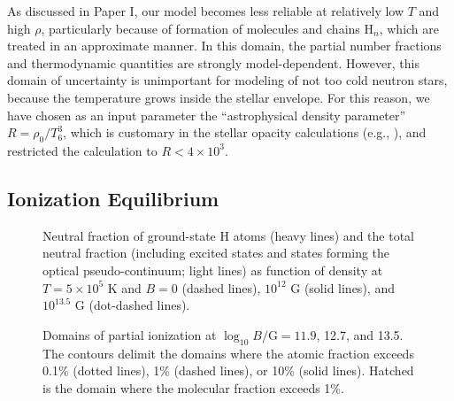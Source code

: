 \documentclass{emulateapj}
\begin{document}
As discussed in Paper I, our model becomes less reliable 
at relatively low $T$ and high $\rho$, particularly because of formation 
of molecules and chains H$_n$, 
which are treated in an approximate manner.
In this domain, the partial number fractions and 
thermodynamic quantities are strongly model-dependent.
However, this domain of uncertainty is unimportant
for modeling of not too cold neutron stars,
because the temperature grows inside the stellar envelope.
For this reason, we have chosen as an input parameter
the ``astrophysical density parameter'' $R=\rho_0/T_6^3$,
which is customary in the stellar opacity calculations
(e.g., \citealp{Seaton,OPAL}), 
and restricted the calculation to $R<4\times10^3$.
         \subsection{Ionization Equilibrium}
\label{sect-ioneq}
%
\begin{figure}
\caption{Neutral fraction of ground-state H atoms (heavy lines)
and the total neutral fraction (including excited states and
states forming the optical pseudo-continuum; light lines) 
as function of density
at $T=5\times 10^5$ K and $B=0$ (dashed lines), $10^{12}$ G
(solid lines), and $10^{13.5}$ G (dot-dashed lines).
\label{fig-ie-b}}
\end{figure}

\begin{figure}
\caption{Domains of partial ionization 
at $\log_{10} B/\mathrm{G} =11.9$, 12.7, and 13.5. 
The contours delimit the domains where the atomic fraction
exceeds 0.1\% (dotted lines), 1\% (dashed lines), or 10\% (solid lines).
Hatched is the domain where the molecular fraction exceeds 1\%.
\label{fig-phase3}}
\end{figure}
\end{document}
